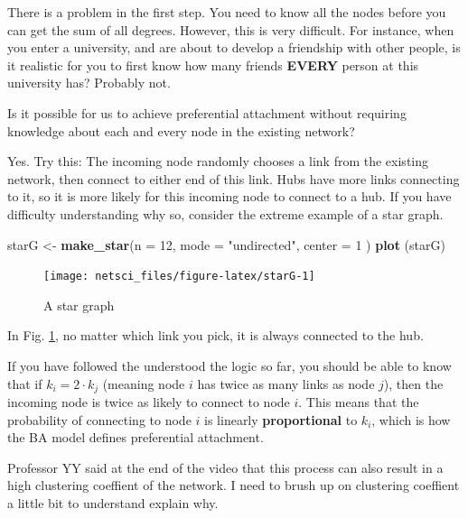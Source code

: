 \documentclass[
]{krantz}
\makeatletter
\newenvironment{Shaded}{\begin{snugshade}}{\end{snugshade}}
\newcommand{\DataTypeTok}[1]{\textcolor[rgb]{0.27,0.27,0.27}{#1}}
\newcommand{\DecValTok}[1]{\textcolor[rgb]{0.06,0.06,0.06}{#1}}
\newcommand{\KeywordTok}[1]{\textcolor[rgb]{0.27,0.27,0.27}{\textbf{#1}}}
\newcommand{\NormalTok}[1]{#1}
\newcommand{\StringTok}[1]{\textcolor[rgb]{0.5,0.5,0.5}{#1}}
\newenvironment{kframe}{%
\medskip{}
\setlength{\fboxsep}{.8em}
 \def\at@end@of@kframe{}%
 \ifinner\ifhmode%
  \def\at@end@of@kframe{\end{minipage}}%
  \begin{minipage}{\columnwidth}%
 \fi\fi%
 \def\FrameCommand##1{\hskip\@totalleftmargin \hskip-\fboxsep
 \colorbox{shadecolor}{##1}\hskip-\fboxsep
     \hskip-\linewidth \hskip-\@totalleftmargin \hskip\columnwidth}%
 \MakeFramed {\advance\hsize-\width
   \@totalleftmargin\z@ \linewidth\hsize
   \@setminipage}}%
 {\par\unskip\endMakeFramed%
 \at@end@of@kframe}
\renewenvironment{Shaded}{\begin{kframe}}{\end{kframe}}
\newenvironment{rmdblock}[1]
  {
  \begin{itemize}
  \renewcommand{\labelitemi}{
    \raisebox{-.7\height}[0pt][0pt]{
      {\setkeys{Gin}{width=3em,keepaspectratio}\texttt{[image: images/\#1]}}
    }
  }
  \setlength{\fboxsep}{1em}
  \begin{kframe}
  \item
  }
  {
  \end{kframe}
  \end{itemize}
  }
\newenvironment{rmdreminder}
  {\begin{rmdblock}{reminder}}
  {\end{rmdblock}}
\makeatother
\begin{document}
There is a problem in the first step. You need to know all the nodes before you can get the sum of all degrees. However, this is very difficult. For instance, when you enter a university, and are about to develop a friendship with other people, is it realistic for you to first know how many friends \textbf{EVERY} person at this university has? Probably not.

Is it possible for us to achieve preferential attachment without requiring knowledge about each and every node in the existing network?

Yes. Try this: The incoming node randomly chooses a link from the existing network, then connect to either end of this link. Hubs have more links connecting to it, so it is more likely for this incoming node to connect to a hub. If you have difficulty understanding why so, consider the extreme example of a star graph.

\begin{Shaded}
\begin{Highlighting}[]
\NormalTok{starG <-}\StringTok{ }\KeywordTok{make_star}\NormalTok{(}\DataTypeTok{n =} \DecValTok{12}\NormalTok{, }\DataTypeTok{mode =} \StringTok{"undirected"}\NormalTok{, }\DataTypeTok{center =} \DecValTok{1}\NormalTok{ )}
\KeywordTok{plot}\NormalTok{ (starG)}
\end{Highlighting}
\end{Shaded}

\begin{figure}

{\centering \texttt{[image: netsci\_files/figure-latex/starG-1]} 

}

\caption{A star graph}\label{fig:starG}
\end{figure}

In Fig. \ref{fig:starG}, no matter which link you pick, it is always connected to the hub.

If you have followed the understood the logic so far, you should be able to know that if \(k_i = 2 \cdot k_j\) (meaning node \(i\) has twice as many links as node \(j\)), then the incoming node is twice as likely to connect to node \(i\). This means that the probability of connecting to node \(i\) is linearly \textbf{proportional} to \(k_i\), which is how the BA model defines preferential attachment.

\begin{rmdreminder}
Professor YY said at the end of the video that this process can also result in a high clustering coeffient of the network. I need to brush up on clustering coeffient a little bit to understand explain why.
\end{rmdreminder}

  

\backmatter
\printindex
\end{document}
